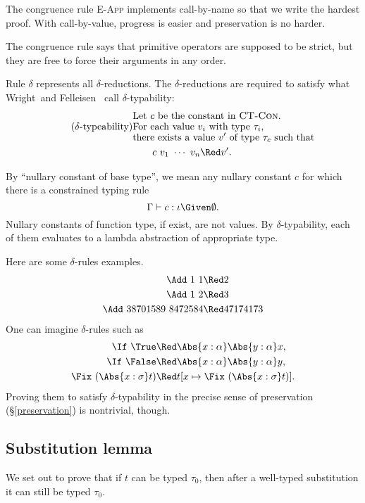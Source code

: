 \documentclass{amsart}
\theoremstyle{definition}
\begin{document}
The congruence rule \textsc{E-App} implements call-by-name so
that we write the hardest proof. With call-by-value, progress is
easier and preservation is no harder.

The congruence rule  says that primitive operators
are supposed to be strict, but they are free to force their
arguments in any order.

Rule \textsc{$\delta$} represents all $\delta$-reductions. The
$\delta$-reductions are required to satisfy what
Wright~and Felleisen~\cite{Wright94} call $\delta$-typability:
\begin{align*}
&\text{Let $c$ be the constant in \textsc{CT-Con}.}\\[-4pt]
\tag{$\delta$-typeability}\label{delta-typability}
&\text{For each value $v_i$ with type $\tau_i$,}\\[-4pt]
&\text{there exists a value $v'$ of type $\tau_c$ such that}\\
&\hspace{2em}c~v_1~\cdots~v_n\Red v'.
\end{align*}

By ``nullary constant of base type'', we mean any nullary
constant $c$ for which there is a constrained typing rule
\[
\Gamma\vdash c:\iota\Given\emptyset.
\]
Nullary constants of function type, if exist, are not values. By
$\delta$-typability, each of them evaluates to a lambda
abstraction of appropriate type.

Here are some $\delta$-rules examples.
\begin{align*}
\Add~1~1&\Red2\\
\Add~1~2&\Red3\\
\Add~38701589~8472584&\Red47174173
\end{align*}
One can imagine $\delta$-rules such as
\begin{align*}
\If~\True &\Red\Abs{x:\alpha}\Abs{y:\alpha}x,\\
\If~\False&\Red\Abs{x:\alpha}\Abs{y:\alpha}y,\\
\Fix~(\Abs{x:\sigma} t)&\Red t[x\mapsto \Fix~(\Abs{x:\sigma} t)].
\end{align*}
Proving them to satisfy $\delta$-typability in the precise sense
of preservation (\S\ref{preservation}) is nontrivial, though.

\subsection{Substitution lemma}
\label{sublem}
\def\Xdef{w}
\def\Exigent{\emptyset}
We set out to prove that if $t$ can be typed $\tau_0$, then after
a well-typed substitution it can still be typed $\tau_0$.
\end{document}
